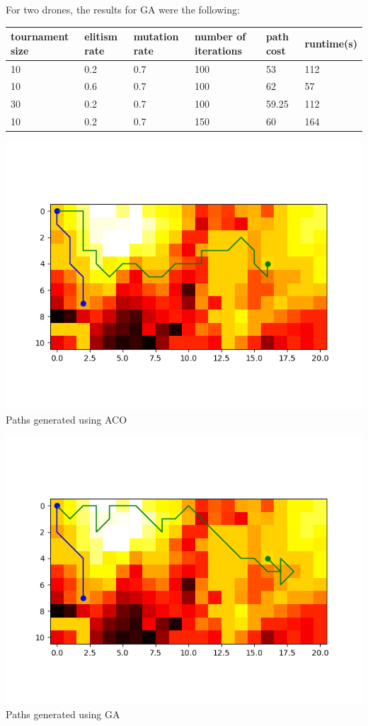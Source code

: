 \documentclass[conference]{IEEEtran}
\begin{document}
For two drones, the results for GA were the following:
\begin{center}
\begin{tabular}{ | m{1.5cm} | m{1cm}| m{1cm} | m{1.5cm} | m{1.5cm} | m{1.5cm} |} 
\hline
tournament size & elitism rate & mutation rate & number of iterations & path cost & runtime(s) \\ 
\hline
10 & 0.2 & 0.7 & 100 & 53 & 112 \\ 
\hline
10 & 0.6 & 0.7 & 100 & 62 & 57  \\ 
\hline
30 & 0.2 & 0.7 & 100 & 59.25 & 112  \\ 
\hline
10 & 0.2 & 0.7 & 150 & 60 & 164  \\ 
\hline
\end{tabular}
\end{center}

\includegraphics[scale=0.5]{performance/aco_2_drone}
Paths generated using ACO

\includegraphics[scale=0.5]{performance/ga_2_drone}
Paths generated using GA
\end{document}
